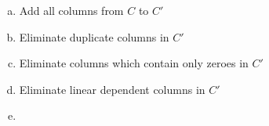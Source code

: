 
\begin{enumerate}[(a)]

\item Add all columns from $C$ to $C'$

\item Eliminate duplicate columns in $C'$

\item Eliminate columns which contain only zeroes in $C'$

\item Eliminate linear dependent columns in $C'$

\item {}

\end{enumerate}

